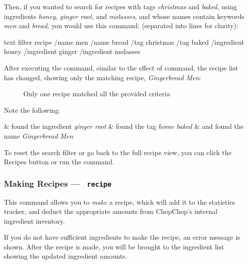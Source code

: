 	Then, if you wanted to search for recipes with tags \emph{christmas} and \emph{baked}, using ingredients \emph{honey},
	\emph{ginger root}, and \emph{molasses}, and whose names contain keywords \emph{men} and \emph{bread}, you would use this command:
	(separated into lines for clarity):

	\begin{blockofcode}{text}
	filter recipe
		/name men /name bread
		/tag christmas /tag baked
		/ingredient honey /ingredient ginger /ingredient molasses
	\end{blockofcode}

	After executing the command, similar to the effect of \hyperlink{FindRecipeCommand}{} command, the recipe list
	has changed, showing only the matching recipe, \emph{Gingerbread Men}:

	\vspace{-1em} %
	\begin{figure}[!htbp]\centering\ContinuedFloat
		\caption{Only one recipe matched all the provided criteria}
	\end{figure}
	\vspace{-3em} %

	\pagebreak
	Note the following:
	\begin{bulletlist}
		&  found the ingredient \emph{ginger root}
		&  found the tag \emph{home baked}
		&  and  found the name \emph{Gingerbread Men}
	\end{bulletlist}

	To reset the search filter or go back to the full recipe view, you can click the Recipes button or run the  command.





\hypertarget{MakeRecipeCommand}{}
\subsubsection{Making Recipes — \texttt{ recipe}}

	This command allows you to \emph{make} a recipe, which will add it to the statistics tracker, and deduct the appropriate amounts from ChopChop's internal ingredient inventory.

	If you do not have sufficient ingredients to make the recipe, an error message is shown. After the recipe is made, you will be brought to the ingredient list showing the updated ingredient amounts.

